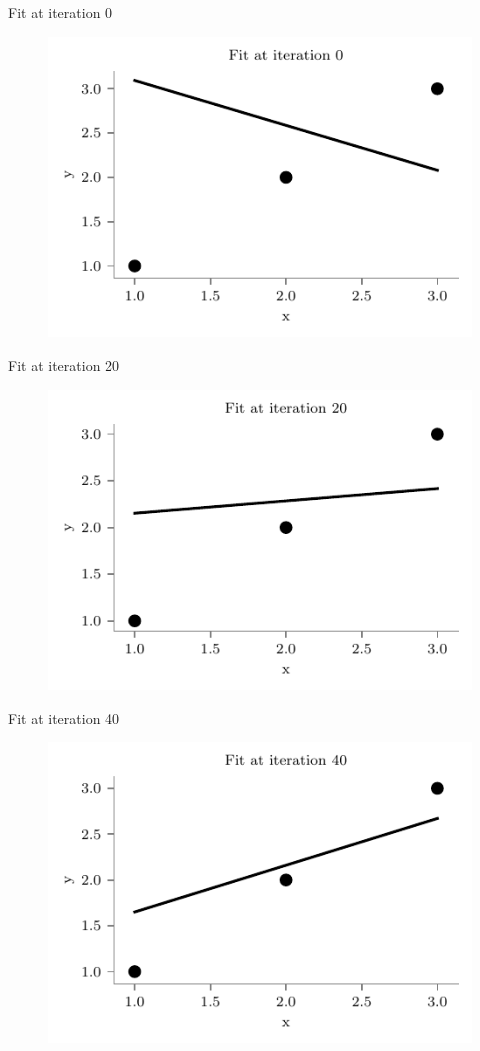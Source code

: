 \documentclass{beamer}
\begin{document}
\begin{frame}{Fit at iteration 0}
\begin{figure}
	\centering
	\includegraphics[width=0.7\linewidth]{fit-iteration-0.pdf}
\end{figure}
\end{frame}

\begin{frame}{Fit at iteration 20}
\begin{figure}
	\centering
	\includegraphics[width=0.7\linewidth]{fit-iteration-20.pdf}
\end{figure}
\end{frame}

\begin{frame}{Fit at iteration 40}
\begin{figure}
	\centering
	\includegraphics[width=0.7\linewidth]{fit-iteration-40.pdf}
\end{figure}
\end{frame}
\end{document}

